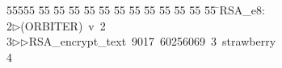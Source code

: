 %
%
\begin{tabbing}
55555 \= 55 \= 55 \= 55 \= 55 \= 55 \= 55 \= 55 \= 55 \= 55 \= 55 \= 55 \= 55 \= \>RSA\_e8:\\[0pt]
2\>$\triangleright$\>(ORBITER)\ v\ 2\ \\[0pt]
3\>$\triangleright$\>$\triangleright$\>RSA\_encrypt\_text\ 9017\ 60256069\ 3\ strawberry\\[0pt]
4\>\end{tabbing}
